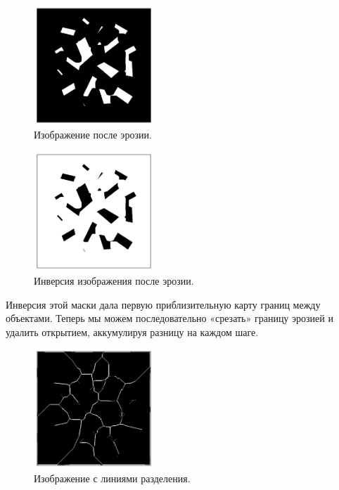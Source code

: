 \documentclass[a4paper,12pt]{article}
\begin{document}
\begin{figure}[H]
    \centering
    \includegraphics[width=0.4\textwidth]{result/2_erosion.png}
    \caption{Изображение после эрозии.}
\end{figure}
\begin{figure}[H]
    \centering
    \includegraphics[width=0.4\textwidth]{result/2_erosion_invert.png}
    \caption{Инверсия изображения после эрозии.}
\end{figure}

Инверсия этой маски дала первую приблизительную карту границ между объектами. Теперь мы можем последовательно «срезать» границу эрозией и удалить открытием, аккумулируя разницу на каждом шаге.

\begin{figure}[H]
    \centering
    \includegraphics[width=0.4\textwidth]{result/2_borders.png}
    \caption{Изображение с линиями разделения.}
\end{figure}
\end{document}
